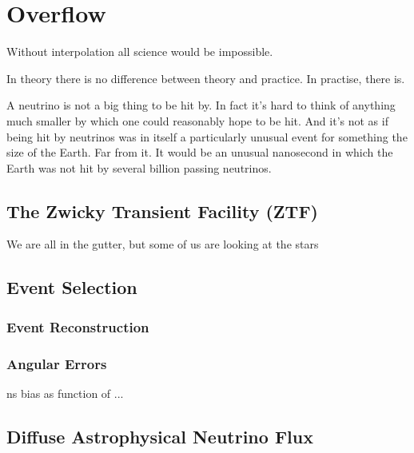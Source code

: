 \setchapterpreamble[u]{\margintoc}
\chapter{Overflow}
\begin{fquote} Without interpolation all science would be impossible. 
\end{fquote}
\begin{fquote} In theory there is no difference between theory and practice. In practise, there is.
\end{fquote}
\begin{fquote} A neutrino is not a big thing to be hit by. In fact it's hard to think of anything much smaller by which one could reasonably hope to be hit. And it's not as if being hit by neutrinos was in itself a particularly unusual event for something the size of the Earth. Far from it. It would be an unusual nanosecond in which the Earth was not hit by several billion passing neutrinos.
\end{fquote}
\section{The Zwicky Transient Facility (ZTF)}
\begin{fquote}We are all in the gutter, but some of us are looking at the stars
\end{fquote}

\section{Event Selection}

\subsection{Event Reconstruction}
\subsection{Angular Errors}

ns bias as function of ...

\section{Diffuse Astrophysical Neutrino Flux}

